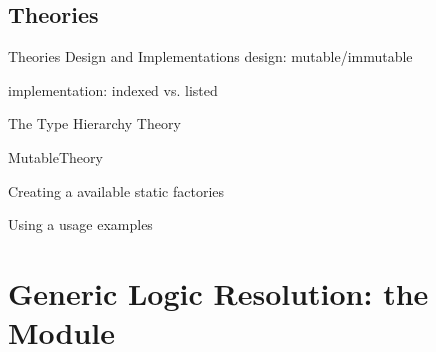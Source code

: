 \documentclass[handout]{beamer}
\begin{document}
\subsection{Theories}

\begin{frame}[allowframebreaks]{Theories Design and Implementations}
    design: mutable/immutable

    implementation: indexed vs. listed
\end{frame}

\begin{frame}[allowframebreaks]{The  Type Hierarchy}
    Theory

    MutableTheory
\end{frame}

\begin{frame}[allowframebreaks]{Creating a }
    available static factories
\end{frame}

\begin{frame}[allowframebreaks]{Using a }
    usage examples
\end{frame}

\section{Generic Logic Resolution: the  Module}
\end{document}
